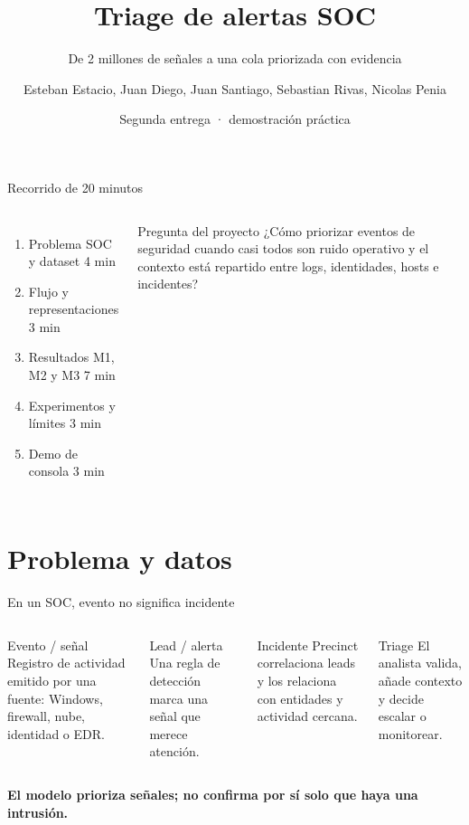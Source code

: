 \documentclass[aspectratio=169,10pt]{beamer}
\title{Triage de alertas SOC}
\subtitle{De 2 millones de señales a una cola priorizada con evidencia}
\author{Esteban Estacio, Juan Diego, Juan Santiago, Sebastian Rivas, Nicolas Penia}
\institute{Aprendizaje Automático · Semestre 8}
\date{Segunda entrega · demostración práctica}
\begin{document}
\begin{frame}[plain]
  \titlepage
\end{frame}

\begin{frame}{Recorrido de 20 minutos}
\begin{columns}[T,onlytextwidth]
  \begin{enumerate}
    \item Problema SOC y dataset \hfill 4 min
    \item Flujo y representaciones \hfill 3 min
    \item Resultados M1, M2 y M3 \hfill 7 min
    \item Experimentos y límites \hfill 3 min
    \item Demo de consola \hfill 3 min
  \end{enumerate}
  \begin{block}{Pregunta del proyecto}
    ¿Cómo priorizar eventos de seguridad cuando casi todos son ruido operativo y el contexto está repartido entre logs, identidades, hosts e incidentes?
  \end{block}
\end{columns}
\end{frame}

\section{Problema y datos}

\begin{frame}{En un SOC, evento no significa incidente}
\begin{columns}[T,onlytextwidth]
  \begin{block}{Evento / señal}
    Registro de actividad emitido por una fuente: Windows, firewall, nube, identidad o EDR.
  \end{block}
  \begin{block}{Lead / alerta}
    Una regla de detección marca una señal que merece atención.
  \end{block}
  \begin{block}{Incidente}
    Precinct correlaciona leads y los relaciona con entidades y actividad cercana.
  \end{block}
  \begin{block}{Triage}
    El analista valida, añade contexto y decide escalar o monitorear.
  \end{block}
\end{columns}
\vspace{0.3cm}
\centering
\textbf{El modelo prioriza señales; no confirma por sí solo que haya una intrusión.}
\end{frame}
\end{document}

